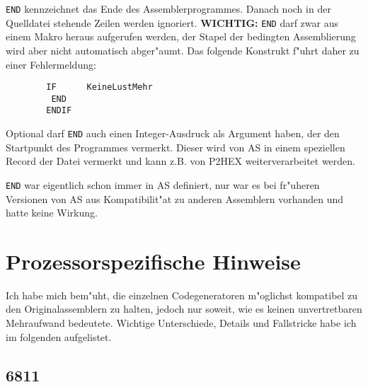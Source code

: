 \documentclass[12pt,a4paper,twoside]{report}
\newcommand{\bb}[1]{{\bf #1}}
\newcommand{\tty}[1]{{\tt #1}}
\begin{document}
{\tty{END} kennzeichnet das Ende des Assemblerprogrammes.  Danach
noch in der Quelldatei stehende Zeilen werden ignoriert.
\bb{WICHTIG:} \tty{END} darf zwar aus einem Makro heraus aufgerufen
werden, der Stapel der bedingten Assemblierung wird aber nicht
automatisch abger"aumt.  Das folgende Konstrukt f"uhrt daher zu
einer Fehlermeldung:
\begin{verbatim}
        IF      KeineLustMehr
         END
        ENDIF
\end{verbatim}
Optional darf \tty{END} auch einen Integer-Ausdruck als Argument haben,
der den Startpunkt des Programmes vermerkt.  Dieser wird von AS in einem
speziellen Record der Datei vermerkt und kann z.B. von P2HEX
weiterverarbeitet werden.
\par
\tty{END} war eigentlich schon immer in AS definiert, nur war es
bei fr"uheren Versionen von AS aus Kompatibilit"at zu anderen
Assemblern vorhanden und hatte keine Wirkung.


\cleardoublepage
\chapter{Prozessorspezifische Hinweise}

Ich habe mich bem"uht, die einzelnen Codegeneratoren m"oglichst kompatibel
zu den Originalassemblern zu halten, jedoch nur soweit, wie es keinen
unvertretbaren Mehraufwand bedeutete.  Wichtige Unterschiede, Details und
Fallstricke habe ich im folgenden aufgelistet.


\section{6811}

}
\end{document}
